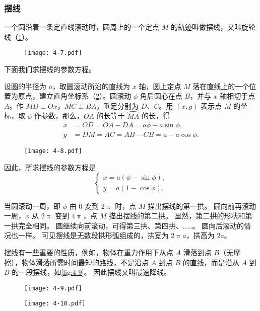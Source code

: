 \subsubsection{摆线}
一个圆沿着一条定直线滚动时，圆周上的一个定点 $M$ 的轨迹叫做摆线，又叫旋轮线（\cref{fig:4-7}）。
\begin{figure}
  \texttt{[image: 4-7.pdf]}
  \caption{}\label{fig:4-7}  
\end{figure}

下面我们求摆线的参数方程。

设圆的半径为 $a$，取圆滚动所沿的直线为 $x$ 轴，圆上定点 $M$ 落在直线上的一个位置为原点，建立直角坐标系（\cref{fig:4-8}）。圆滚动 $\phi$ 角后圆心在点 $B$，并与 $x$ 轴相切于点 $A$。作 $MD\perp Ox$，$MC\perp BA$，垂足分别为 $D$、$C$。用 $(x,y)$ 表示点 $M$ 的坐标，取 $\phi$ 作参数，那么，$OA$ 的长等于 $\overparen{MA}$ 的长，得
\begin{align*}
  x&=OD=OA-DA=a\phi-a\sin\phi,\\
  y&=DM=AC=AB-CB=a-a\cos\phi.
\end{align*}

\begin{figure}
  \texttt{[image: 4-8.pdf]}
  \caption{}\label{fig:4-8}  
\end{figure}

因此，所求摆线的参数方程是
\[ \begin{cases}x=a(\phi-\sin\phi),\\y=a(1-\cos\phi).\end{cases} \]

当圆滚动一周，即 $\phi$ 由 0 变到 $2\uppi$ 时，点 $M$ 描出摆线的第一拱。
圆向前再滚动一周，$\phi$ 从 $2\uppi$ 变到 $4\uppi$，点 $M$ 描出摆线的第二拱。
显然，第二拱的形状和第一拱完全相同。
圆继续向前滚动，可得第三拱、第四拱、……。
圆向后滚动的情况也一样。
可见摆线是无数段拱形弧组成的，拱宽为 $2\uppi a$，拱高为 $2a$。

摆线有一些重要的性质，例如，物体在重力作用下从点 $A$ 滑落到点 $B$（无摩擦），物体滑落所需时间最短的路线，不是沿点 $A$ 到点 $B$ 的直线，而是沿从 $A$ 到 $B$ 的一段摆线，如\cref{fig:4-9}。
因此摆线又叫最速降线。
\begin{figure}
  \begin{minipage}[b]{0.65\linewidth}\centering
    \texttt{[image: 4-9.pdf]}
    \caption{}\label{fig:4-9}  
  \end{minipage}
  \begin{minipage}[b]{0.3\linewidth}\centering
    \texttt{[image: 4-10.pdf]}
    \caption{}\label{fig:4-10}  
  \end{minipage}
\end{figure}

